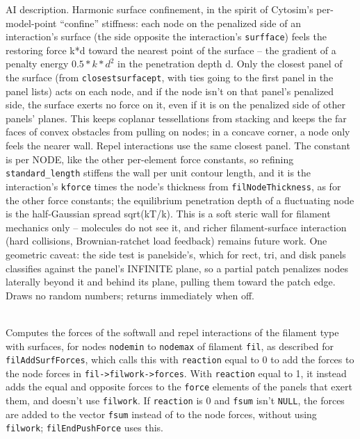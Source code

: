 \documentclass {scrbook}
\newcommand {\ttt} {\texttt}
\begin{document}
\begin{description}
AI description. Harmonic surface confinement, in the spirit of Cytosim's per-model-point ``confine'' stiffness: each node on the penalized side of an interaction's surface (the side opposite the interaction's \ttt{surfface}) feels the restoring force k*d toward the nearest point of the surface -- the gradient of a penalty energy $0.5*k*d^2$ in the penetration depth d. Only the closest panel of the surface (from \ttt{closestsurfacept}, with ties going to the first panel in the panel lists) acts on each node, and if the node isn't on that panel's penalized side, the surface exerts no force on it, even if it is on the penalized side of other panels' planes. This keeps coplanar tessellations from stacking and keeps the far faces of convex obstacles from pulling on nodes; in a concave corner, a node only feels the nearer wall. Repel interactions use the same closest panel. The constant is per NODE, like the other per-element force constants, so refining \ttt{standard\_length} stiffens the wall per unit contour length, and it is the interaction's \ttt{kforce} times the node's thickness from \ttt{filNodeThickness}, as for the other force constants; the equilibrium penetration depth of a fluctuating node is the half-Gaussian spread sqrt(kT/k). This is a soft steric wall for filament mechanics only -- molecules do not see it, and richer filament-surface interaction (hard collisions, Brownian-ratchet load feedback) remains future work. One geometric caveat: the side test is panelside's, which for rect, tri, and disk panels classifies against the panel's INFINITE plane, so a partial patch penalizes nodes laterally beyond it and behind its plane, pulling them toward the patch edge. Draws no random numbers; returns immediately when off.


\item[\ttt{void filSurfInteractForces(filamentptr fil,int nodemin,int nodemax,int reaction,double *fsum)}] %
\hfill \\
Computes the forces of the softwall and repel interactions of the filament type with surfaces, for nodes \ttt{nodemin} to \ttt{nodemax} of filament \ttt{fil}, as described for \ttt{filAddSurfForces}, which calls this with \ttt{reaction} equal to 0 to add the forces to the node forces in \ttt{fil->filwork->forces}. With \ttt{reaction} equal to 1, it instead adds the equal and opposite forces to the \ttt{force} elements of the panels that exert them, and doesn't use \ttt{filwork}. If \ttt{reaction} is 0 and \ttt{fsum} isn't \ttt{NULL}, the forces are added to the vector \ttt{fsum} instead of to the node forces, without using \ttt{filwork}; \ttt{filEndPushForce} uses this.


\end{description}
\end{document}
